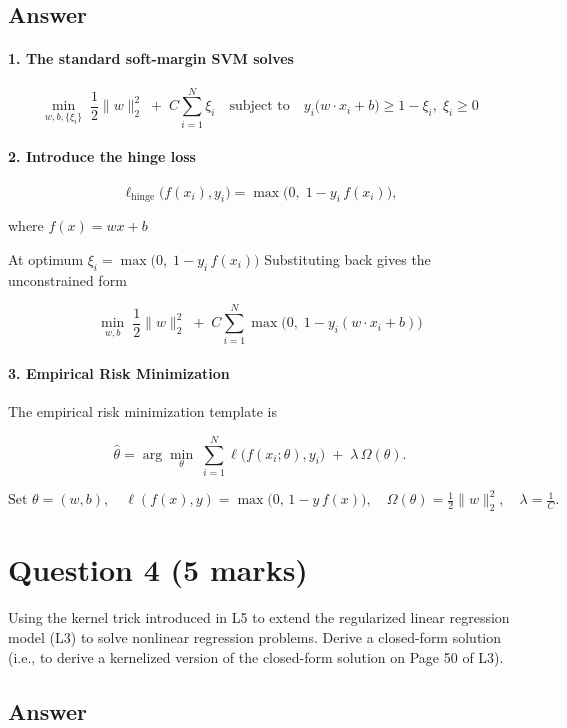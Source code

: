 \documentclass{article}
\begin{document}
\subsection*{Answer}
\paragraph{1. The standard soft-margin SVM solves}

\[
\min_{w,b,\{\xi_i\}} \;\frac{1}{2}\lVert w\rVert_2^2 \;+\; C\sum_{i=1}^N \xi_i
\quad\text{subject to}\quad
y_i\bigl(w\cdot x_i + b\bigr)\ge 1 - \xi_i,\;\xi_i\ge0
\]

\paragraph{2. Introduce the hinge loss}

\[
\ell_{\mathrm{hinge}}\bigl(f(x_i),y_i\bigr)
=\max\bigl(0,\;1 - y_i\,f(x_i)\bigr),
\]

where \(f(x) = wx + b\)

At optimum \(\xi_i = \max\bigl(0,\;1-y_i\,f(x_i)\bigr)\) Substituting back gives the unconstrained form

\[
\min_{w,b}\;\frac{1}{2}\lVert w\rVert_2^2 \;+\; C\sum_{i=1}^N \max\bigl(0,\;1 - y_i(w\cdot x_i + b)\bigr)
\]


\paragraph{3. Empirical Risk Minimization}
The empirical risk minimization template is


\[
\hat\theta
=\arg\min_{\theta}\;\sum_{i=1}^N \ell\bigl(f(x_i;\theta),y_i\bigr)
\;+\;\lambda\,\Omega(\theta).
\]



\[\text{Set }
\theta=(w,b),\quad
\ell(f(x),y)=\max\bigl(0,\,1 - y\,f(x)\bigr),\quad
\Omega(\theta)=\tfrac12\lVert w\rVert_2^2,\quad
\lambda=\tfrac1C.
\]



\section*{Question 4 (5 marks)}
Using the kernel trick introduced in L5 to extend the regularized linear regression model (L3) to solve nonlinear regression problems. Derive a closed-form solution (i.e., to derive a kernelized version of the closed-form solution on Page 50 of L3).
\bigskip
\subsection*{Answer}
\end{document}
